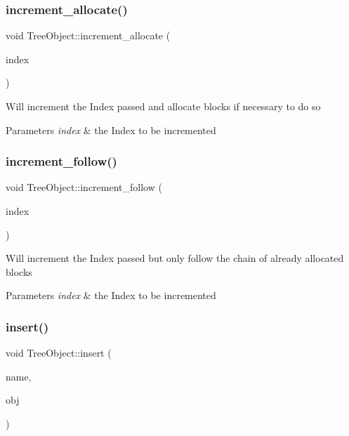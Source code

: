 \subsubsection{\texorpdfstring{increment\+\_\+allocate()}{increment\_allocate()}}
{\footnotesize\ttfamily void Tree\+Object\+::increment\+\_\+allocate (\begin{DoxyParamCaption}\item[{Index $\ast$}]{index }\end{DoxyParamCaption})}

Will increment the Index passed and allocate blocks if necessary to do so 
\begin{DoxyParams}{Parameters}
{\em index} & the Index to be incremented \\
\hline
\end{DoxyParams}
\mbox{\label{class_tree_object_a86fbde9e7ee245385bf7ca7a8f355bd0}} 
\subsubsection{\texorpdfstring{increment\+\_\+follow()}{increment\_follow()}}
{\footnotesize\ttfamily void Tree\+Object\+::increment\+\_\+follow (\begin{DoxyParamCaption}\item[{Index $\ast$}]{index }\end{DoxyParamCaption})}

Will increment the Index passed but only follow the chain of already allocated blocks 
\begin{DoxyParams}{Parameters}
{\em index} & the Index to be incremented \\
\hline
\end{DoxyParams}
\mbox{\label{class_tree_object_af8cc57edba9f435b52ccf33cfbbb2fc6}} 
\subsubsection{\texorpdfstring{insert()}{insert()}}
{\footnotesize\ttfamily void Tree\+Object\+::insert (\begin{DoxyParamCaption}\item[{string}]{name,  }\item[{\mbox{\hyperlink{class_tree_object}{Tree\+Object}} $\ast$}]{obj }\end{DoxyParamCaption})\hspace{0.3cm}{\ttfamily [virtual]}}

